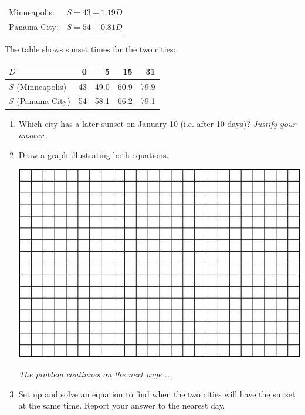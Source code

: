 \documentclass[12pt]{article}
\begin{document}
\begin{enumerate}
\vspace{.1in}

\begin{center}
\begin{tabular} {ll} 
Minneapolis: &$S=43+1.19D$ \\
Panama City: & $S=54+0.81D$ \\
\end{tabular}
\end{center}

The table shows sunset times for the two cities:

\begin{center}
\begin{tabular} {|l|r|r|r|r|} \hline
$D$ & 0 & 5 & 15 & 31 \\ \hline
$S$ (Minneapolis) & 43 &  49.0 & 60.9 & 79.9  \\ \hline
$S$ (Panama City) & 54 & 58.1 & 66.2 & 79.1 \\ \hline
\end{tabular}
\end{center}

\begin{enumerate}

\item Which city has a later sunset on January 10 (i.e. after 10 days)?  \emph{Justify your answer.}
\vfill

\item Draw a graph illustrating both equations.
\vspace{.1in}
\begin{center}
 {\includegraphics [width = 6in] {../GraphPaper}}
\end{center}
\vfill
\emph{The problem continues on the next page ...}
\pagebreak
\item Set up and solve an equation to find when the two cities will have the sunset at the same time. Report your answer to the nearest day.


\end{enumerate}
\end{enumerate}
\end{document}
